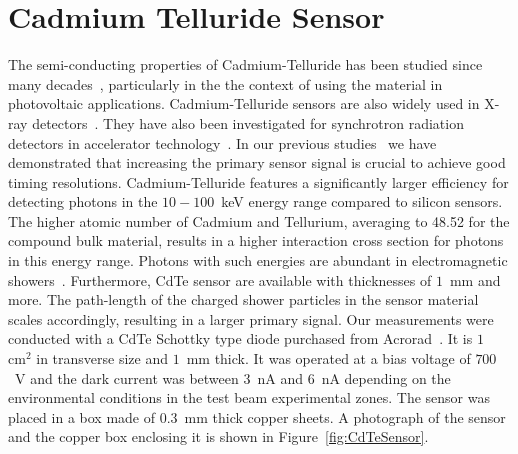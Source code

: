 %
%
%
\section{Cadmium Telluride Sensor}
\label{sec:siliconpad}
The semi-conducting properties of Cadmium-Telluride has been studied since many decades~\cite{cdtegeneric}, 
particularly in the the context of using the material in photovoltaic applications.
Cadmium-Telluride sensors are also widely used in X-ray detectors~\cite{cdtesensorsgeneric,cdtesensors2,cdtesensors3}. 
They have also been investigated for synchrotron radiation detectors in accelerator technology~\cite{cdtelhc}.   
In our previous 
studies~\cite{Anderson:2015gha,MCPShowerMaxPaper,Ronzhin201552,SiliconTiming,PixelatedMCP,Anderson:2016ygg,Anderson:2015tia} 
we have demonstrated that increasing the primary sensor signal is crucial to achieve good timing resolutions.  
Cadmium-Telluride features a significantly larger efficiency for detecting photons in the $10-100$~keV energy range 
compared to silicon sensors. The higher atomic number of Cadmium and Tellurium, averaging to 48.52 for the 
compound bulk material, results in a higher interaction cross section for photons in this energy range. 
Photons with such energies are abundant in electromagnetic showers~\cite{showercomposition}. 
Furthermore, CdTe sensor are available with thicknesses of $1$~mm and more. 
The path-length of the charged shower particles in the sensor material scales accordingly, 
resulting in a larger primary signal.
%
Our measurements were conducted with a CdTe Schottky type diode purchased from 
Acrorad~\cite{acrorad}. It is $1$~$\mathrm{cm}^{2}$ in transverse size and $1$~mm thick.
It was operated at a bias voltage of $700$~V and the dark current was between $3$~nA 
and $6$~nA depending on the environmental conditions in the test beam experimental 
zones. The sensor was placed in a box made of $0.3$~mm thick copper sheets. A 
photograph of the sensor and the copper box enclosing it is shown in 
Figure~\ref{fig:CdTeSensor}.


